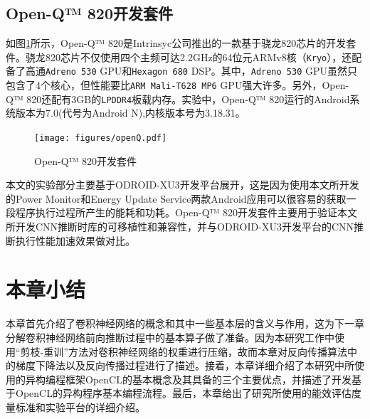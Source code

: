 \subsection{Open-Q™ 820开发套件}
\label{chapter:chapter2-5-2}
如图\ref{figure:figureopenQ}所示，Open-Q™ 820是Intrinsyc公司推出的一款基于骁龙820芯片的开发套件。骁龙820芯片不仅使用四个主频可达2.2GHz的64位元ARMv8核（\texttt{Kryo}），还配备了高通\texttt{Adreno 530} GPU和\texttt{Hexagon 680} DSP。其中，\texttt{Adreno 530} GPU虽然只包含了4个核心，但性能要比\texttt{ARM Mali-T628 MP6} GPU强大许多。另外，Open-Q™ 820还配有3GB的\texttt{LPDDR4}板载内存。实验中，Open-Q™ 820运行的Android系统版本为7.0(代号为Android N),内核版本号为3.18.31。

\begin{figure}[htbp]
    \begin{center}
    \texttt{[image: figures/openQ.pdf]}
    \end{center}
    \caption{Open-Q™ 820开发套件}\label{figure:figureopenQ}
\end{figure}

本文的实验部分主要基于ODROID-XU3开发平台展开，这是因为使用本文所开发的Power Monitor和Energy Update Service两款Android应用可以很容易的获取一段程序执行过程所产生的能耗和功耗。Open-Q™ 820开发套件主要用于验证本文所开发CNN推断时库的可移植性和兼容性，并与ODROID-XU3开发平台的CNN推断执行性能加速效果做对比。

\section{本章小结}

本章首先介绍了卷积神经网络的概念和其中一些基本层的含义与作用，这为下一章分解卷积神经网络前向推断过程中的基本算子做了准备。因为本研究工作中使用“剪枝-重训”方法对卷积神经网络的权重进行压缩，故而本章对反向传播算法中的梯度下降法以及反向传播过程进行了描述。接着，本章详细介绍了本研究中所使用的异构编程框架OpenCL的基本概念及其具备的三个主要优点，并描述了开发基于OpenCL的异构程序基本编程流程。最后，本章给出了研究所使用的能效评估度量标准和实验平台的详细介绍。

\cleardoublepage 
